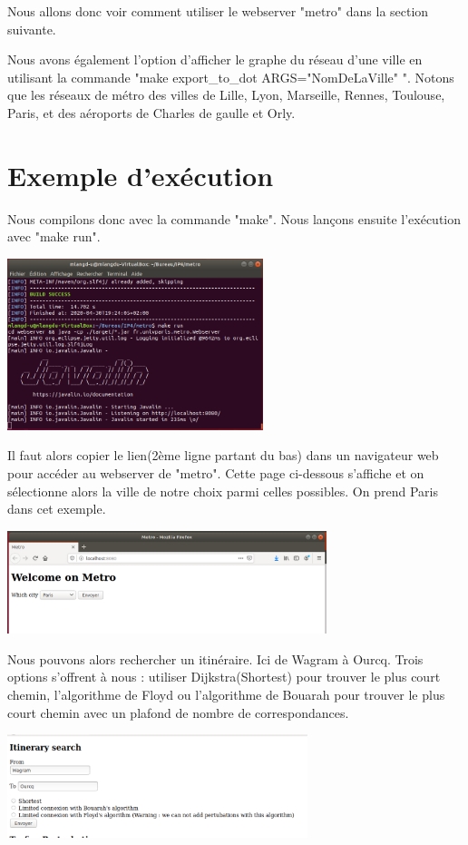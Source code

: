\documentclass[french, 12pt]{article}
\begin{document}
Nous allons donc voir comment utiliser le webserver "metro" dans la section suivante.

Nous avons également l'option d'afficher le graphe du réseau d'une ville en utilisant la commande "make export\_to\_dot ARGS="NomDeLaVille" ". Notons que les réseaux de métro des villes de Lille, Lyon, Marseille, Rennes, Toulouse, Paris, et des aéroports de Charles de gaulle et Orly.

\section{Exemple d'exécution}
Nous compilons donc avec la commande "make".
Nous lançons ensuite l'exécution avec "make run".

\includegraphics[height=5cm]{images/execute.png}

Il faut alors copier le lien(2ème ligne partant du bas) dans un navigateur web pour accéder au webserver de "metro". Cette page ci-dessous s'affiche et on sélectionne alors la ville de notre choix parmi celles possibles. On prend Paris dans cet exemple.

\includegraphics[height=3cm]{images/pageDAccueil.png}

Nous pouvons alors rechercher un itinéraire. Ici de Wagram à Ourcq. Trois options s'offrent à nous : utiliser Dijkstra(Shortest) pour trouver le plus court chemin, l'algorithme de Floyd ou l'algorithme de Bouarah pour trouver le plus court chemin avec un plafond de nombre de correspondances.

\includegraphics[height=3cm]{images/research.png}
\end{document}
